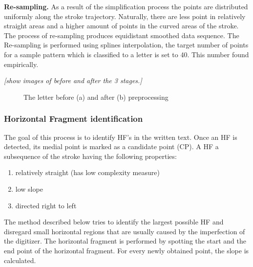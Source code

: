 \documentclass[journal,compsoc]{IEEEtran}
\begin{document}
\textbf{Re-sampling.} As a result of the simplification process the points are distributed uniformly along the stroke trajectory. Naturally, there are less point in relatively straight areas and a higher amount of points in the curved areas of the stroke. The process of re-sampling produces equidistant smoothed data sequence. The Re-sampling is performed using splines interpolation, the target number of points for a sample pattern which is classified to a letter is set to 40. This number found empirically.

\emph{[show images of before and after the 3 stages.]}
 
\begin{figure}
	\centering
    \caption{The letter  before (a) and after (b) preprocessing}
   \label{fig:D_before_after_preprocessing}
\end{figure}

\subsubsection{Horizontal Fragment identification}
The goal of this process is to identify HF's in the written text. Once an HF is detected, its medial point is marked as a candidate point (CP). A HF a subsequence of the stroke having the following properties: 
\begin{enumerate}
\item relatively straight (has low complexity measure)
\item low slope
\item directed right to left 
\end{enumerate}
The method described below tries to identify the largest possible HF and disregard small horizontal regions that are usually caused by the imperfection of the digitizer. The horizontal fragment is performed by spotting the start and the end point of the horizontal fragment. For every newly obtained point, the slope is calculated.\\
\end{document}
